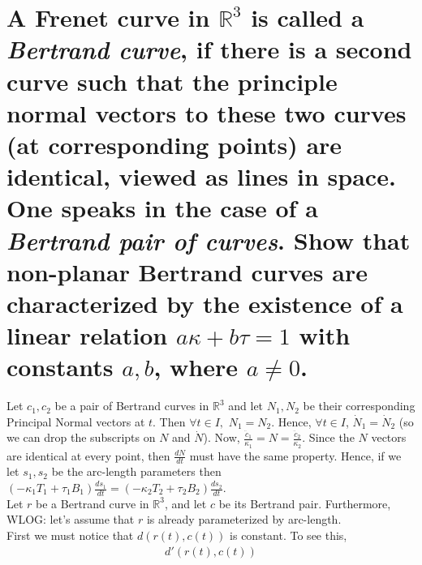 \documentclass[12pt]{amsart}
\begin{document}
\setcounter{equation}{0}
\newpage%
\section{A Frenet curve in $\mathbb{R}^3$ is called a \emph{Bertrand curve}, if there is a second curve such that the principle normal vectors to these two curves (at corresponding points) are identical, viewed as lines in space. One speaks in the case of a \emph{Bertrand pair of curves}. Show that non-planar Bertrand curves are characterized by the existence of a linear relation $a\kappa+b\tau=1$ with constants $a,b$, where $a\neq0$.} Let $c_1,c_2$ be a pair of Bertrand curves in $\mathbb{R}^3$ and let $N_1,N_2$ be their corresponding Principal Normal vectors at $t$. Then $\forall t\in I,$ $N_1=N_2$. Hence, $\forall t\in I$, $\dot N_1=\dot N_2$ (so we can drop the subscripts on $N$ and $\dot N$). Now, $\frac{\ddot c_1}{\kappa_1}=N=\frac{\ddot c_2}{\kappa_2}$. Since the $N$ vectors are identical at every point, then $\frac{dN}{dt}$ must have the same property. Hence, if we let $s_1,s_2$ be the arc-length parameters then $(-\kappa_1T_1+\tau_1B_1)\frac{ds_1}{dt}=(-\kappa_2T_2+\tau_2B_2)\frac{ds_2}{dt}$.
\\Let $r$ be a Bertrand curve in $\mathbb{R}^3$, and let $c$ be its Bertrand pair. Furthermore, WLOG: let's assume that $r$ is already parameterized by arc-length.
\\First we must notice that $d(r(t),c(t))$ is constant. To see this,
\begin{align*}
	d'(r(t),c(t))
\end{align*}

\newpage
\end{document}
